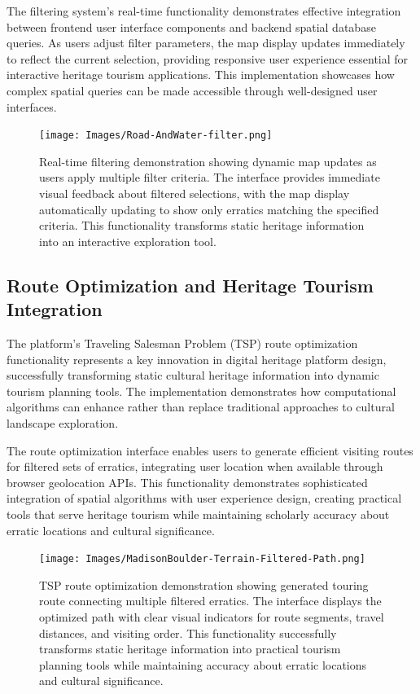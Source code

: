 The filtering system's real-time functionality demonstrates effective integration between frontend user interface components and backend spatial database queries. As users adjust filter parameters, the map display updates immediately to reflect the current selection, providing responsive user experience essential for interactive heritage tourism applications. This implementation showcases how complex spatial queries can be made accessible through well-designed user interfaces.

\begin{figure}[htbp]
    \centering
    \texttt{[image: Images/Road-AndWater-filter.png]}
    \caption{Real-time filtering demonstration showing dynamic map updates as users apply multiple filter criteria. The interface provides immediate visual feedback about filtered selections, with the map display automatically updating to show only erratics matching the specified criteria. This functionality transforms static heritage information into an interactive exploration tool.}
    \label{fig:active_filtering_demo}
\end{figure}

\subsection{Route Optimization and Heritage Tourism Integration}
\label{subsec:route_optimization_results}

The platform's Traveling Salesman Problem (TSP) route optimization functionality represents a key innovation in digital heritage platform design, successfully transforming static cultural heritage information into dynamic tourism planning tools. The implementation demonstrates how computational algorithms can enhance rather than replace traditional approaches to cultural landscape exploration.

The route optimization interface enables users to generate efficient visiting routes for filtered sets of erratics, integrating user location when available through browser geolocation APIs. This functionality demonstrates sophisticated integration of spatial algorithms with user experience design, creating practical tools that serve heritage tourism while maintaining scholarly accuracy about erratic locations and cultural significance.

\begin{figure}[htbp]
    \centering
    \texttt{[image: Images/MadisonBoulder-Terrain-Filtered-Path.png]}
    \caption{TSP route optimization demonstration showing generated touring route connecting multiple filtered erratics. The interface displays the optimized path with clear visual indicators for route segments, travel distances, and visiting order. This functionality successfully transforms static heritage information into practical tourism planning tools while maintaining accuracy about erratic locations and cultural significance.}
    \label{fig:route_optimization_demo}
\end{figure}

